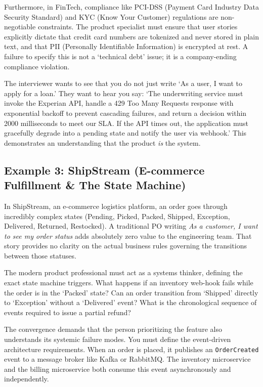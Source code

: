Furthermore, in FinTech, compliance like PCI-DSS (Payment Card Industry
Data Security Standard) and KYC (Know Your Customer) regulations are
non-negotiable constraints. The product specialist must ensure that user
stories explicitly dictate that credit card numbers are tokenized and
never stored in plain text, and that PII (Personally Identifiable
Information) is encrypted at rest. A failure to specify this is not a
`technical debt' issue; it is a company-ending compliance violation.

The interviewer wants to see that you do not just write `As a user, I
want to apply for a loan.' They want to hear you say: `The underwriting
service must invoke the Experian API, handle a 429 Too Many Requests
response with exponential backoff to prevent cascading failures, and
return a decision within 2000 milliseconds to meet our SLA. If the API
times out, the application must gracefully degrade into a pending state
and notify the user via webhook.' This demonstrates an understanding
that the product \emph{is} the system.

\subsection{Example 3: ShipStream (E-commerce Fulfillment \& The State
Machine)}\label{example-3-shipstream-e-commerce-fulfillment-the-state-machine}

In ShipStream, an e-commerce logistics platform, an order goes through
incredibly complex states (Pending, Picked, Packed, Shipped, Exception,
Delivered, Returned, Restocked). A traditional PO writing \emph{As a
customer, I want to see my order status} adds absolutely zero value to
the engineering team. That story provides no clarity on the actual
business rules governing the transitions between those statuses.

The modern product professional must act as a systems thinker, defining
the exact state machine triggers. What happens if an inventory web-hook
fails while the order is in the `Packed' state? Can an order transition
from `Shipped' directly to `Exception' without a `Delivered' event? What
is the chronological sequence of events required to issue a partial
refund?

The convergence demands that the person prioritizing the feature also
understands its systemic failure modes. You must define the event-driven
architecture requirements. When an order is placed, it publishes an
\texttt{OrderCreated} event to a message broker like Kafka or RabbitMQ.
The inventory microservice and the billing microservice both consume
this event asynchronously and independently.

